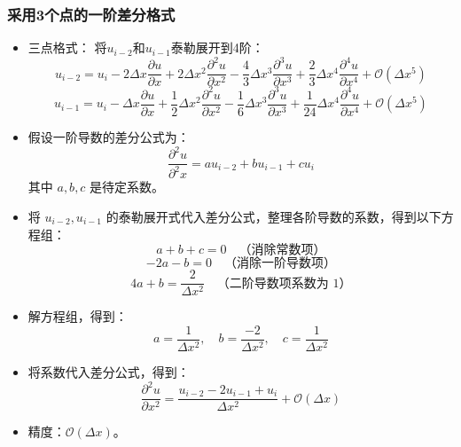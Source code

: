 \documentclass[12pt,a4paper]{article}
\begin{document}
\subsubsection{采用3个点的一阶差分格式}
\begin{itemize}
    \item 三点格式：
    将$u_{i-2}$和$u_{i-1}$泰勒展开到4阶：
    \[u_{i-2} = u_i - 2\Delta x \frac{\partial u}{\partial x} + 2\Delta x^2 \frac{\partial^2 u}{\partial x^2} -\frac{4}{3} \Delta x^3 \frac{\partial^3 u}{\partial x^3} + \frac{2}{3} \Delta x^4 \frac{\partial^4 u}{\partial x^4} + \mathcal{O}(\Delta x^5)\]
    \[u_{i-1} = u_i - \Delta x \frac{\partial u}{\partial x} + \frac{1}{2} \Delta x^2 \frac{\partial^2 u}{\partial x^2} -\frac{1}{6} \Delta x^3 \frac{\partial^3 u}{\partial x^3} + \frac{1}{24} \Delta x^4 \frac{\partial^4 u}{\partial x^4} + \mathcal{O}(\Delta x^5)\]
    \item 假设一阶导数的差分公式为：
    \[
    \frac{\partial^2 u}{\partial^2 x} = a u_{i-2} + b u_{i-1} + c u_i
    \]
    其中 \( a, b, c \) 是待定系数。
    \item 将 \( u_{i-2}, u_{i-1} \) 的泰勒展开式代入差分公式，整理各阶导数的系数，得到以下方程组：
    \[
    a + b + c  = 0 \quad \text{（消除常数项）}
    \]
    \[
    -2a - b  = 0 \quad \text{（消除一阶导数项）}
    \]
    \[
    4a + b  = \frac{2}{\Delta x^2} \quad \text{（二阶导数项系数为 1）}
    \]
    \item 解方程组，得到：
    \[
    a = \frac{1}{\Delta x^2}, \quad b = \frac{-2}{\Delta x^2}, \quad c = \frac{1}{\Delta x^2}
    \]

    \item 将系数代入差分公式，得到：
    \[
    \frac{\partial^2 u}{\partial x^2} = \frac{u_{i-2} -2 u_{i-1} + u_i }{\Delta x^2} + \mathcal{O}(\Delta x)
    \]

    \item 精度：$\mathcal{O}(\Delta x)$。


\end{itemize}
\end{document}
